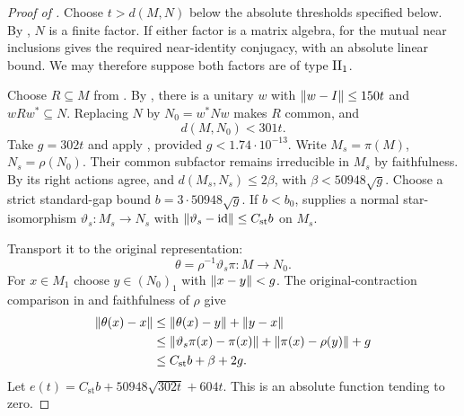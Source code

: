 \begin{proof}[Proof of ]
Choose $t> d(M,N)$ below the absolute thresholds specified below.
By , $N$ is a finite factor.  If either factor
is a matrix algebra,  for the mutual near inclusions
gives the required near-identity conjugacy, with an absolute linear
bound.  We may therefore suppose both factors are of type $\mathrm{II}_1$.

Choose $R\subseteq M$ from .
By , there is a unitary $w$ with
$\lVert w-I\rVert\le150t$ and $wRw^*\subseteq N$.  Replacing $N$ by
$N_0=w^*Nw$ makes $R$ common, and
\[
 d(M,N_0)<301t.
\]
Take $g=302t$ and apply , provided
$g<1.74\cdot10^{-13}$.  Write $M_s=\pi(M)$, $N_s=\rho(N_0)$.
Their common subfactor remains irreducible in $M_s$ by faithfulness.
By  its right actions agree, and
$d(M_s,N_s)\le2\beta$, with $\beta<50948\sqrt g$.
Choose a strict standard-gap bound $b=3\cdot50948\sqrt g$.
If $b<b_0$,  supplies a normal
star-isomorphism $\vartheta_s:M_s\to N_s$ with
$\lVert\vartheta_s-\operatorname{id}\rVert\le C_{\mathrm{st}}b$ on $M_s$.

Transport it to the original representation:
\[
 \theta=\rho^{-1}\vartheta_s\pi:M\longrightarrow N_0.
\]
For $x\in M_1$ choose $y\in(N_0)_1$ with $\lVert x-y\rVert<g$.
The original-contraction comparison in
 and faithfulness of $\rho$ give
\begin{align*}
 \lVert\theta(x)-x\rVert
 &\le\lVert\theta(x)-y\rVert+\lVert y-x\rVert\\
 &\le\lVert\vartheta_s\pi(x)-\pi(x)\rVert
       +\lVert\pi(x)-\rho(y)\rVert+g\\
 &\le C_{\mathrm{st}}b+\beta+2g.
\end{align*}
Let $e(t)=C_{\mathrm{st}}b+50948\sqrt{302t}+604t$.
This is an absolute function tending to zero.


\end{proof}
